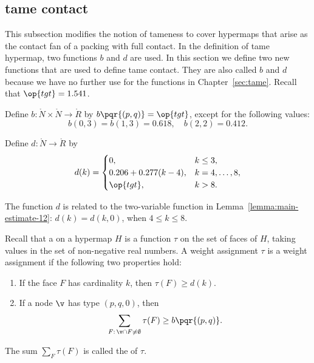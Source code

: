 \subsection{tame contact}

This subsection modifies the notion of tameness to cover hypermaps
that arise as the contact fan of a packing with full contact.  In the
definition of tame hypermap, two functions $b$ and $d$ are used.  In
this section we define two new functions that are used to define tame
contact.  They are also  called $b$ and $d$ because we have no
further use for the functions in Chapter~\ref{sec:tame}.  
Recall that $\op{tgt}=1.541$.
%
%

\begin{definition}[b]
  Define $b:\ring{N}\times \ring{N}\to \ring{R}$ by
  $b\pqr{(p,q)}=\op{tgt}$, except for the following values:
\[
b(0,3)=b(1,3)=0.618,\quad b(2,2)=0.412.
\]
\end{definition}
%

\begin{definition}[d]
Define $d:\ring{N}\to \ring{R}$ by
\[d(k) = \begin{cases}
0, & k\le 3, \\
0.206 + 0.277 (k-4),& k=4,\ldots,8,\\
\op{tgt},& k>8.\\
\end{cases}
\]
\end{definition}
%

The function $d$ is related to the two-variable function in
Lemma~\ref{lemma:main-estimate-12}: $d(k) = d(k,0)$, when $4\le k\le
8$.

\begin{definition}
%
  Recall that a  on a hypermap $H$ is a
  function $\tau$ on the set of faces of $H$, taking values in the set
  of non-negative real numbers. A weight assignment $\tau$
is a 
  weight assignment if the following two properties hold:
%
\begin{enumerate}
\item If the face $F$ has cardinality $k$, then
$\tau(F) \ge d(k)$.
\item If a node $\v$ has type $(p,q,0)$, then
  \[\sum_{F:\,\v\cap F\ne\emptyset} \tau(F) \ge
    b{\pqr{(p,q)}}.\]
\end{enumerate}
The sum $\sum_F \tau(F)$ is called the  of $\tau$.
%
\end{definition}


